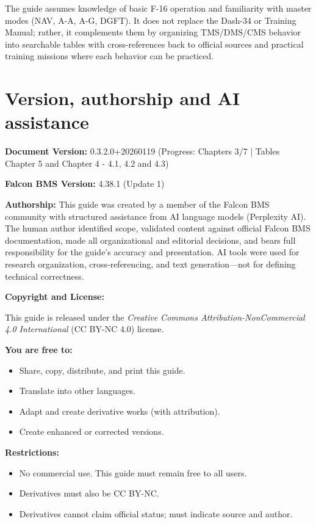 \documentclass[11pt, a4paper, twoside]{report}
\newcommand{\docversion}{0.3.2.0}
\newcommand{\docbuild}{20260119}
\newcommand{\chapterscompletedof}{3/7}
\newcommand{\tablesfilledpct}{Chapter 5 and Chapter 4 - 4.1, 4.2 and 4.3}
\newcommand{\fulldocversion}{\docversion+\docbuild}
\begin{document}
The guide assumes knowledge of basic F-16 operation and familiarity with master modes (NAV, A-A, A-G, DGFT). It does not replace the Dash-34 or Training Manual; rather, it complements them by organizing TMS/DMS/CMS behavior into searchable tables with cross-references back to official sources and practical training missions where each behavior can be practiced.

\section{Version, authorship and AI assistance}

\label{sec:C1-S3}

\textbf{Document Version:} \fulldocversion{} (Progress: Chapters \chapterscompletedof{} | Tables \tablesfilledpct)

\textbf{Falcon BMS Version:} 4.38.1 (Update 1)

\textbf{Authorship:} This guide was created by a member of the Falcon BMS community with structured assistance from AI language models (Perplexity AI). The human author identified scope, validated content against official Falcon BMS documentation, made all organizational and editorial decisions, and bears full responsibility for the guide's accuracy and presentation. AI tools were used for research organization, cross-referencing, and text generation---not for defining technical correctness.

\textbf{Copyright and License:}

This guide is released under the \textit{Creative Commons Attribution-NonCommercial 4.0 International} (CC BY-NC 4.0) license.

\textbf{You are free to:}

\begin{itemize}
  \item Share, copy, distribute, and print this guide.
  \item Translate into other languages.
  \item Adapt and create derivative works (with attribution).
  \item Create enhanced or corrected versions.
\end{itemize}

\textbf{Restrictions:}

\begin{itemize}
  \item No commercial use. This guide must remain free to all users.
  \item Derivatives must also be CC BY-NC.
  \item Derivatives cannot claim official status; must indicate source and author.
\end{itemize}
\end{document}

